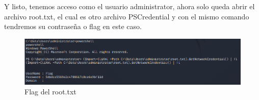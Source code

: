 \documentclass{article}
\begin{document}
Y listo, tenemos acceso como el usuario administrator, ahora solo queda abrir el archivo root.txt, el cual es otro archivo PSCredential y con el mismo comando tendremos su contraseña o flag en este caso.
\begin{figure}[H]
	\center
	\includegraphics[width=\textwidth]{images/omni/32.png}
	\caption{Flag del root.txt}
\end{figure}
\end{document}
